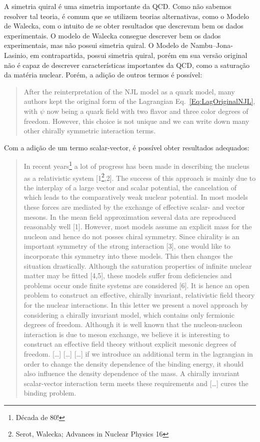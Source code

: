 A simetria quiral é uma simetria importante da QCD\parencite{Koch}. Como não sabemos resolver tal teoria, é comum que se utilizem teorias alternativas, como o Modelo de Walecka, com o intuito de se obter resultados que descrevam bem os dados experimentais. O modelo de Walecka consegue descrever bem os dados experimentais, mas não possui simetria quiral. O Modelo de Nambu--Jona-Lasinio, em contrapartida, possui simetria quiral, porém em sua versão original não é capaz de descrever características importantes da QCD, como a saturação da matéria nuclear. Porém, a adição de outros termos é possível:\parencite{Buballa}
\begin{quote}
After the reinterpretation of the NJL model as a quark model, many authors kept the original form of the Lagrangian Eq.~\eqref{Eq:LagOriginalNJL}, with $\psi$ now being a quark field with two flavor and three color degrees of freedom. However, this choice is not unique and we can write down many other chirally symmetric interaction terms.
\end{quote}
%
Com a adição de um termo scalar-vector, é possível obter resultados adequados\parencite{Koch}:
\begin{quote}
	In recent years\footnote{Década de 80!} a lot of progress has been made in describing the nucleus as a relativistic system [1\footnote{Serot, Walecka; Advances in Nuclear Physics 16},2]. The success of this approach is mainly due to the interplay of a large vector and scalar potential, the cancelation of which leads to the comparatively weak nuclear potential. In most models these forces are mediated by the exchange of effective scalar- and vector mesons. In the mean field approximation several data are reproduced reasonably well [1].
	However, most models assume an explicit mass for the nucleon and hence do not posses chiral symmetry. Since chirality is an important symmetry of the strong interaction [3], one would like to incorporate this symmetry into these models. This then changes the situation drastically. Although the saturation properties of infinite nuclear matter may be fitted [4,5], these models suffer from deficiencies and problems occur onde finite systems are considered [6]. It is hence an open problem to construct an effective, chirally invariant, relativistic field theory for the nuclear interactions.
	In this letter we present a novel approach by considering a chirally invariant model, which contains only fermionic degrees of freedom. Although it is well known that the nucleon-nucleon interaction is due to meson exchange, we believe it is interesting to construct an effective field theory without explicit mesonic degrees of freedom. [\dots]
	[\dots]
	[\dots] if we introduce an additional term in the lagrangian in order to change the density dependence of the binding energy, it should also influence the density dependence of the mass. A chirally invariant scalar-vector interaction term meets these requirements and [\dots] cures the binding problem.
\end{quote}

